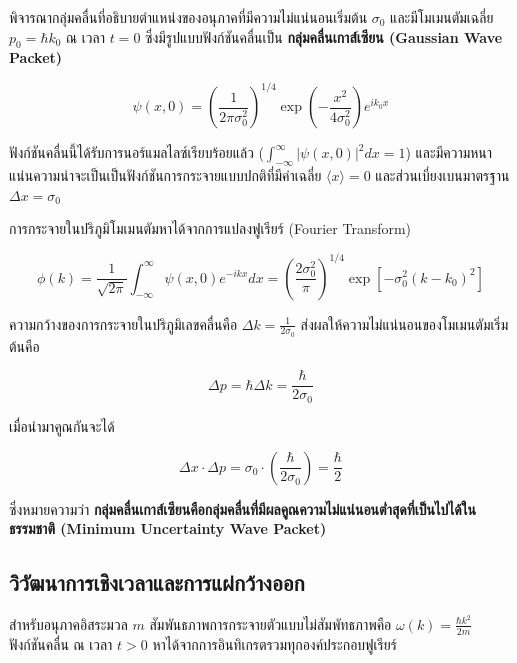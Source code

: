 พิจารณากลุ่มคลื่นที่อธิบายตำแหน่งของอนุภาคที่มีความไม่แน่นอนเริ่มต้น $\sigma_0$ และมีโมเมนตัมเฉลี่ย $p_0 = \hbar k_0$ ณ เวลา $t = 0$ ซึ่งมีรูปแบบฟังก์ชันคลื่นเป็น \textbf{กลุ่มคลื่นเกาส์เซียน (Gaussian Wave Packet)}

\begin{equation}
\psi(x, 0) = \left( \frac{1}{2\pi \sigma_0^2} \right)^{1/4} \exp\left( -\frac{x^2}{4\sigma_0^2} \right) e^{i k_0 x}
\label{eq:gaussian_packet_t0}
\end{equation}

ฟังก์ชันคลื่นนี้ได้รับการนอร์แมลไลซ์เรียบร้อยแล้ว ($\int_{-\infty}^\infty |\psi(x, 0)|^2 dx = 1$) และมีความหนาแน่นความน่าจะเป็นเป็นฟังก์ชันการกระจายแบบปกติที่มีค่าเฉลี่ย $\langle x \rangle = 0$ และส่วนเบี่ยงเบนมาตรฐาน $\Delta x = \sigma_0$

การกระจายในปริภูมิโมเมนตัมหาได้จากการแปลงฟูเรียร์ (Fourier Transform)

\begin{equation}
\phi(k) = \frac{1}{\sqrt{2\pi}} \int_{-\infty}^\infty \psi(x, 0) e^{-i k x} dx = \left( \frac{2\sigma_0^2}{\pi} \right)^{1/4} \exp\left[ -\sigma_0^2 (k - k_0)^2 \right]
\label{eq:momentum_distribution}
\end{equation}

ความกว้างของการกระจายในปริภูมิเลขคลื่นคือ $\Delta k = \frac{1}{2\sigma_0}$ ส่งผลให้ความไม่แน่นอนของโมเมนตัมเริ่มต้นคือ

\begin{equation}
\Delta p = \hbar \Delta k = \frac{\hbar}{2\sigma_0}
\end{equation}

เมื่อนำมาคูณกันจะได้

\begin{equation}
\Delta x \cdot \Delta p = \sigma_0 \cdot \left( \frac{\hbar}{2\sigma_0} \right) = \frac{\hbar}{2}
\label{eq:minimum_uncertainty_packet}
\end{equation}

ซึ่งหมายความว่า \textbf{กลุ่มคลื่นเกาส์เซียนคือกลุ่มคลื่นที่มีผลคูณความไม่แน่นอนต่ำสุดที่เป็นไปได้ในธรรมชาติ (Minimum Uncertainty Wave Packet)}

\subsection{วิวัฒนาการเชิงเวลาและการแผ่กว้างออก}

สำหรับอนุภาคอิสระมวล $m$ สัมพันธภาพการกระจายตัวแบบไม่สัมพัทธภาพคือ $\omega(k) = \frac{\hbar k^2}{2m}$ ฟังก์ชันคลื่น ณ เวลา $t > 0$ หาได้จากการอินทิเกรตรวมทุกองค์ประกอบฟูเรียร์

